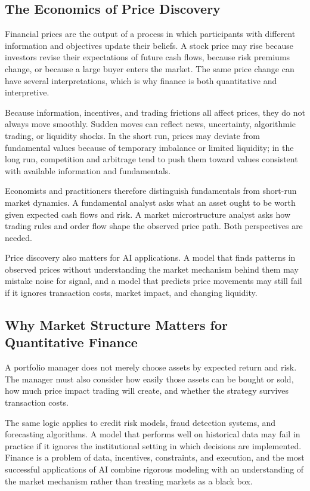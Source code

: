 \documentclass[../ai_in_finance]{subfiles}
\begin{document}
\subsection{The Economics of Price Discovery}

Financial prices are the output of a process in which participants with different information and objectives update their beliefs. A stock price may rise because investors revise their expectations of future cash flows, because risk premiums change, or because a large buyer enters the market. The same price change can have several interpretations, which is why finance is both quantitative and interpretive.

Because information, incentives, and trading frictions all affect prices, they do not always move smoothly. Sudden moves can reflect news, uncertainty, algorithmic trading, or liquidity shocks. In the short run, prices may deviate from fundamental values because of temporary imbalance or limited liquidity; in the long run, competition and arbitrage tend to push them toward values consistent with available information and fundamentals.

Economists and practitioners therefore distinguish fundamentals from short-run market dynamics. A fundamental analyst asks what an asset ought to be worth given expected cash flows and risk. A market microstructure analyst asks how trading rules and order flow shape the observed price path. Both perspectives are needed.

Price discovery also matters for AI applications. A model that finds patterns in observed prices without understanding the market mechanism behind them may mistake noise for signal, and a model that predicts price movements may still fail if it ignores transaction costs, market impact, and changing liquidity.

\subsection{Why Market Structure Matters for Quantitative Finance}

A portfolio manager does not merely choose assets by expected return and risk. The manager must also consider how easily those assets can be bought or sold, how much price impact trading will create, and whether the strategy survives transaction costs.

The same logic applies to credit risk models, fraud detection systems, and forecasting algorithms. A model that performs well on historical data may fail in practice if it ignores the institutional setting in which decisions are implemented. Finance is a problem of data, incentives, constraints, and execution, and the most successful applications of AI combine rigorous modeling with an understanding of the market mechanism rather than treating markets as a black box.
\end{document}
